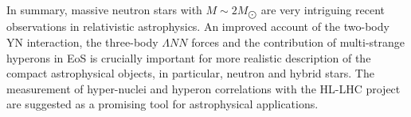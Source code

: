 In summary, massive neutron stars with $M \sim 2M_{\bigodot}$ are very intriguing recent observations in relativistic astrophysics. 
An improved account of the two-body YN interaction, the three-body $\Lambda NN$ forces and the contribution of multi-strange hyperons in EoS is crucially important for more realistic description of the compact astrophysical objects, in particular, neutron and hybrid stars. The measurement of hyper-nuclei and hyperon correlations with the HL-LHC project are suggested as a promising tool for astrophysical applications.
